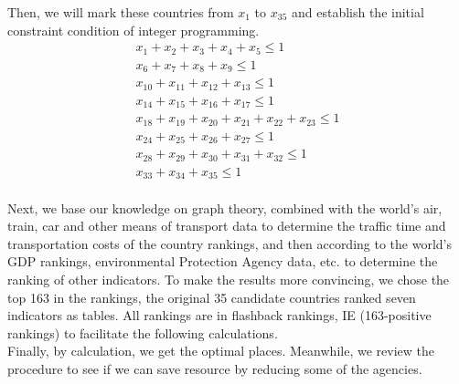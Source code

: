 \documentclass{mcmthesis}
\begin{document}
\hspace*{8mm}Then, we will mark these countries from $x_1$ to $x_{35}$ and establish the initial constraint condition of integer programming.
\begin{eqnarray}
x_1+x_2+x_3+x_4+x_5\leq 1 \\
x_6+x_7+x_8+x_9\leq 1 \\
x_{10}+x_{11}+x_{12}+x_{13}\leq 1 \\
x_{14}+x_{15}+x_{16}+x_{17}\leq 1 \\
x_{18}+x_{19}+x_{20}+x_{21}+x_{22}+x_{23}\leq 1 \\
x_{24}+x_{25}+x_{26}+x_{27}\leq 1 \\
x_{28}+x_{29}+x_{30}+x_{31}+x_{32}\leq 1 \\
x_{33}+x_{34}+x_{35}\leq 1
\end{eqnarray} \\
\hspace*{8mm}Next, we base our knowledge on graph theory, combined with the world's air, train, car and other means of transport data to determine the traffic time and transportation costs of the country rankings, and then according to the world's GDP rankings, environmental Protection Agency data, etc. to determine the ranking of other indicators. To make the results more convincing, we chose the top 163 in the rankings, the original 35 candidate countries ranked seven indicators as tables. All rankings are in flashback rankings, IE (163-positive rankings) to facilitate the following calculations. \\
\hspace*{8mm}Finally, by calculation, we get the optimal places. Meanwhile, we review the procedure to see if we can save resource by reducing some of the agencies.
\end{document}
